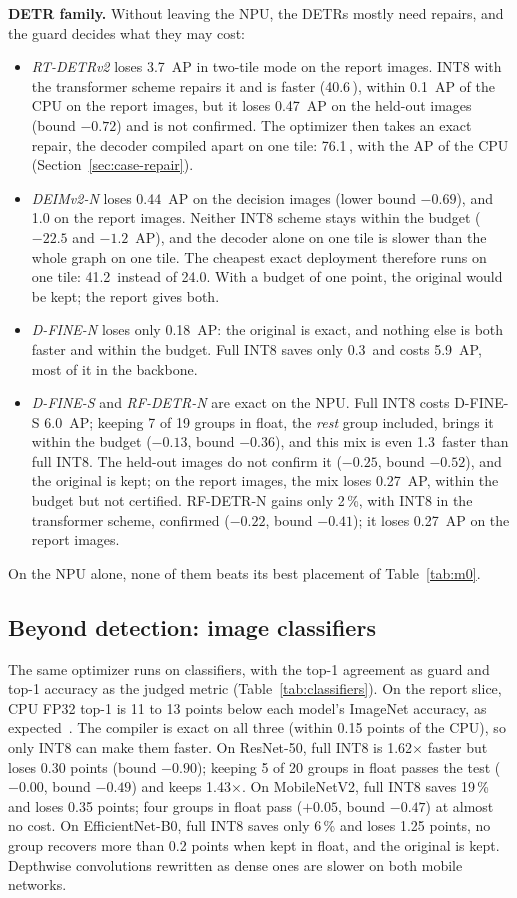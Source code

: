 \documentclass[conference]{IEEEtran}
\newcommand{\ms}{\,\text{ms}}
\begin{document}
\textbf{DETR family.} Without leaving the NPU, the DETRs mostly need repairs, and the guard decides what they may cost:
\begin{itemize}
\item \emph{RT-DETRv2} loses 3.7~AP in two-tile mode on the report images. INT8 with the transformer scheme repairs it and is faster (40.6\ms{}), within 0.1~AP of the CPU on the report images, but it loses 0.47~AP on the held-out images (bound $-0.72$) and is not confirmed. The optimizer then takes an exact repair, the decoder compiled apart on one tile: 76.1\ms{}, with the AP of the CPU (Section~\ref{sec:case-repair}).
\item \emph{DEIMv2-N} loses 0.44~AP on the decision images (lower bound $-0.69$), and 1.0 on the report images. Neither INT8 scheme stays within the budget ($-22.5$ and $-1.2$~AP), and the decoder alone on one tile is slower than the whole graph on one tile. The cheapest exact deployment therefore runs on one tile: 41.2\ms{} instead of 24.0. With a budget of one point, the original would be kept; the report gives both.
\item \emph{D-FINE-N} loses only 0.18~AP: the original is exact, and nothing else is both faster and within the budget. Full INT8 saves only 0.3\ms{} and costs 5.9~AP, most of it in the backbone.
\item \emph{D-FINE-S} and \emph{RF-DETR-N} are exact on the NPU. Full INT8 costs D-FINE-S 6.0~AP; keeping 7 of 19 groups in float, the \emph{rest} group included, brings it within the budget ($-0.13$, bound $-0.36$), and this mix is even 1.3\ms{} faster than full INT8. The held-out images do not confirm it ($-0.25$, bound $-0.52$), and the original is kept; on the report images, the mix loses 0.27~AP, within the budget but not certified. RF-DETR-N gains only 2\,\%, with INT8 in the transformer scheme, confirmed ($-0.22$, bound $-0.41$); it loses 0.27~AP on the report images.
\end{itemize}
On the NPU alone, none of them beats its best placement of Table~\ref{tab:m0}.


\subsection{Beyond detection: image classifiers}
\label{sec:eval-classifiers}

The same optimizer runs on classifiers, with the top-1 agreement as guard and top-1 accuracy as the judged metric (Table~\ref{tab:classifiers}). On the report slice, CPU FP32 top-1 is 11 to 13 points below each model's ImageNet accuracy, as expected~\cite{recht2019imagenetv2}. The compiler is exact on all three (within 0.15 points of the CPU), so only INT8 can make them faster. On ResNet-50, full INT8 is 1.62$\times$ faster but loses 0.30 points (bound $-0.90$); keeping 5 of 20 groups in float passes the test ($-0.00$, bound $-0.49$) and keeps 1.43$\times$. On MobileNetV2, full INT8 saves 19\,\% and loses 0.35 points; four groups in float pass ($+0.05$, bound $-0.47$) at almost no cost. On EfficientNet-B0, full INT8 saves only 6\,\% and loses 1.25 points, no group recovers more than 0.2 points when kept in float, and the original is kept. Depthwise convolutions rewritten as dense ones are slower on both mobile networks.
\end{document}
